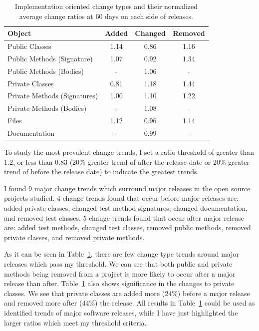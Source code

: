 \begin{table}[ht]
\begin{center}
\tabcolsep=0.11cm
\begin{tabular}{| l | c | c | c |}
\hline
Object & Added & Changed & Removed\\
\hline
Public Classes & 1.14 & 0.86 & 1.16 \\
Public Methods (Signature) & 1.07 & 0.92 & 1.34 \\
Public Methods (Bodies) & - & 1.06 & - \\
Private Classes & 0.81 & 1.18 & 1.44 \\
Private Methods (Signatures) & 1.00 & 1.10 & 1.22 \\
Private Methods (Bodies) & - & 1.08 & - \\
Files & 1.12 & 0.96 & 1.14 \\
Documentation & - & 0.99 & - \\
\hline
\end{tabular}
\end{center}
\caption{Implementation oriented change types and their normalized average change ratios at 60 days on each side of releases. \label{tab:apie-ratio}}
\end{table}

To study the most prevalent change trends, I set a ratio threshold of greater than 1.2, or less than 0.83 (20\% greater trend of after the release date
or 20\% greater trend of before the release date) to indicate the greatest trends.

I found 9 major change trends which surround major releases in the open source
projects studied. 4 change trends found that occur before major releases are: added private classes, 
changed test method signatures, changed documentation, and removed test classes.
5 change trends found that occur after major release are: added test methods, changed test classes, removed public methods, removed
private classes, and removed private methods.

As it can be seen in Table~\ref{tab:apie-ratio}, there are few change type trends around major releases which pass my threshold. We can see that both public
and private methods
being removed from a project is more likely to occur after a major release than after. Table~\ref{tab:apie-ratio} also shows significance in the changes to private
classes. We see that private classes are added more (24\%) before a major release and removed more after (44\%) the release. 
All results in Table~\ref{tab:apie-ratio} could be used as identified trends of major software releases, while I have just highlighted the larger ratios
which meet my threshold criteria.

